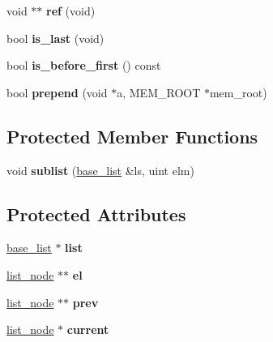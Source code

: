 \begin{DoxyCompactItemize}
\item 
\mbox{\label{classbase__list__iterator_a83e7e29f22ac47a1c7738593aab13f47}} 
void $\ast$$\ast$ {\bfseries ref} (void)
\item 
\mbox{\label{classbase__list__iterator_a3d304328ad6a912179c0149ee2d5202a}} 
bool {\bfseries is\+\_\+last} (void)
\item 
\mbox{\label{classbase__list__iterator_a3e9e74b9d8395e890598ffef5d474eec}} 
bool {\bfseries is\+\_\+before\+\_\+first} () const
\item 
\mbox{\label{classbase__list__iterator_ae8b458a36860265f0bacfa0cfc1cbe51}} 
bool {\bfseries prepend} (void $\ast$a, M\+E\+M\+\_\+\+R\+O\+OT $\ast$mem\+\_\+root)
\end{DoxyCompactItemize}
\subsection*{Protected Member Functions}
\begin{DoxyCompactItemize}
\item 
\mbox{\label{classbase__list__iterator_a4c720f94d26370e2a81fa87a931938b6}} 
void {\bfseries sublist} (\mbox{\hyperlink{classbase__list}{base\+\_\+list}} \&ls, uint elm)
\end{DoxyCompactItemize}
\subsection*{Protected Attributes}
\begin{DoxyCompactItemize}
\item 
\mbox{\label{classbase__list__iterator_ac29530de7ae99677cab8e577840d0db6}} 
\mbox{\hyperlink{classbase__list}{base\+\_\+list}} $\ast$ {\bfseries list}
\item 
\mbox{\label{classbase__list__iterator_a45662daa3206c8f538f70e9a664baca9}} 
\mbox{\hyperlink{structlist__node}{list\+\_\+node}} $\ast$$\ast$ {\bfseries el}
\item 
\mbox{\label{classbase__list__iterator_a1599b59197f75370a06732d686dfce5e}} 
\mbox{\hyperlink{structlist__node}{list\+\_\+node}} $\ast$$\ast$ {\bfseries prev}
\item 
\mbox{\label{classbase__list__iterator_aa015d1f9662a5d1a6587742873803a3f}} 
\mbox{\hyperlink{structlist__node}{list\+\_\+node}} $\ast$ {\bfseries current}
\end{DoxyCompactItemize}
